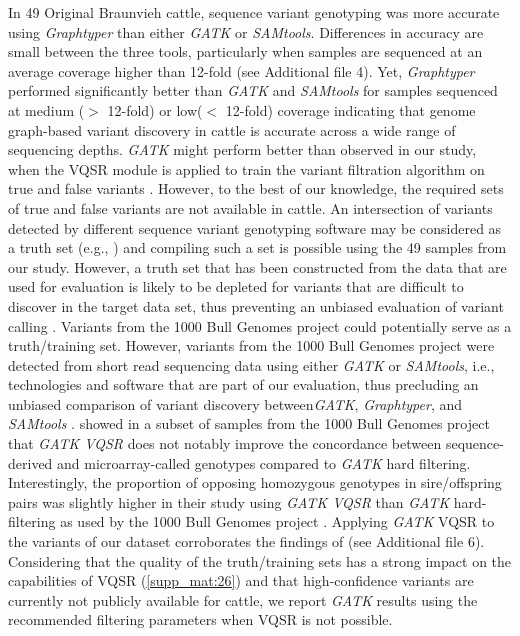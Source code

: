 \documentclass[../main.tex]{subfiles}
\begin{document}
In 49 Original Braunvieh cattle, sequence variant genotyping was more accurate using \emph{Graphtyper} than either \emph{GATK} or \emph{SAMtools}. Differences in accuracy are small between the three tools, particularly when samples are sequenced at an average coverage higher than 12-fold (see Additional file 4). Yet, \emph{Graphtyper} performed significantly better than \emph{GATK} and \emph{SAMtools} for samples sequenced at medium ($>$ 12-fold) or low($<$ 12-fold)
coverage indicating that genome graph-based variant discovery in cattle is accurate across a wide range of sequencing depths. \emph{GATK} might perform better than observed in our study, when the VQSR module is applied to train the variant filtration algorithm on true and false variants \citep{pirooznia2014validation}. However, to the best of our knowledge, the required sets of true and false variants are not available in cattle. An intersection of variants detected by different sequence variant genotyping software may be considered as a truth set (e.g., \citep{alberto2018convergent}) and compiling such a set is possible using the 49 samples from our study. However, a truth set that has been constructed from the data that are used for evaluation is likely to be depleted for variants that are difficult to discover in the target data set, thus preventing an unbiased evaluation of variant calling \citep{li2018synthetic}. Variants from the 1000 Bull Genomes project \citep{Daetwyler2014,Hayes2019} could potentially serve as a truth/training set. However, variants from the 1000 Bull Genomes project were detected from short read sequencing data using either \emph{GATK} or \emph{SAMtools}, i.e., technologies and software that are part of our evaluation, thus precluding an unbiased comparison of variant discovery between\emph{GATK}, \emph{Graphtyper}, and \emph{SAMtools} \citep{li2018synthetic}. \citep{vander2018best} showed in a subset of samples from the 1000 Bull Genomes project that \emph{GATK VQSR} does not notably improve the concordance between sequence-derived and microarray-called genotypes compared to \emph{GATK} hard filtering. Interestingly, the proportion of opposing homozygous genotypes in sire/offspring pairs was slightly higher in their study using \emph{GATK VQSR} than \emph{GATK} hard-filtering as used by the 1000 Bull Genomes project \citep{vander2018best}. Applying \emph{GATK} VQSR to the variants of our dataset corroborates the findings of \citep{vander2018best} (see Additional file 6). Considering that the quality of the truth/training sets has a strong impact on the capabilities of VQSR (\ref{supp_mat:26}) and that high-confidence variants are currently not publicly available for cattle, we report \emph{GATK} results using the recommended filtering parameters when VQSR is not possible.
\end{document}
